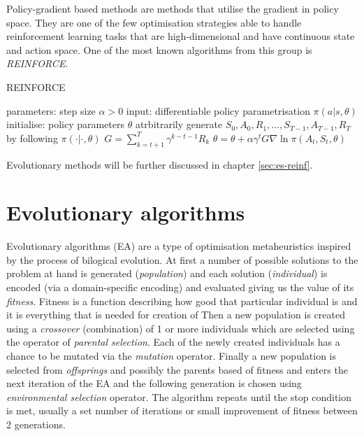 Policy-gradient based methods are methods that utilise the gradient in policy space. They are one  of the few optimisation strategies able to handle reinforcement learning tasks that are high-dimensional and have continuous state and action space. One of the most known algorithms from this group is \emph{REINFORCE}.


\begin{algorithm}
    \begin{algorithmic}[1]
    \caption{REINFORCE}
    \label{alg:reinforce}
        \State parameters: step size $\alpha>0$ 
        \State input: differentiable policy parametrisation $\pi(a|s,\theta)$
        \State initialise: policy parameters $\theta$ atrbitrarily
            \State generate $S_0, A_0, R_1,\dots,S_{T-1},A_{T-1},R_T$ by following $\pi(\cdot|\cdot,\theta)$
                \State $G = \sum_{k=t+1}^T\gamma^{k-t-1}R_k$
                \State $\theta = \theta + \alpha \gamma^t G \nabla\ln\pi(A_t,S_t,\theta)$
            \EndFor
        \EndFor
    \end{algorithmic}
\end{algorithm}

Evolutionary methods will be further discussed in chapter \ref{sec:es-reinf}.

\section{Evolutionary algorithms}
\label{sec:ea}
Evolutionary algorithms (EA) are a type of optimisation metaheuristics inspired by the process of bilogical evolution. At first a number of possible solutions to the problem at hand is generated (\emph{population}) and each solution (\emph{individual}) is encoded (via a domain-specific encoding) and evaluated giving us the value of its \emph{fitness}. Fitness is a function describing how good that particular individual is and it is everything that is needed for creation of  Then a new population is created using a \emph{crossover} (combination) of 1 or more individuals which are selected using the operator of \emph{parental selection}. Each of the newly created individuals has a chance to be mutated via the \emph{mutation} operator. Finally a new population is selected from \emph{offsprings} and possibly the parents based of fitness and enters the next iteration of the EA and the following generation is chosen using \emph{environmental selection} operator. The algorithm repeats until the stop condition is met, usually a set number of iterations or small improvement of fitness between 2 generations. 

